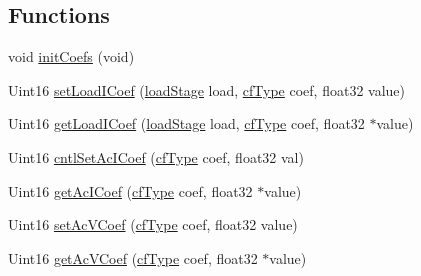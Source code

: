 \subsection*{Functions}
\begin{DoxyCompactItemize}
\item 
void \hyperlink{a00014_a91a941a20fc5a9465397d4701e0beaf4}{init\-Coefs} (void)
\item 
Uint16 \hyperlink{a00014_ac551a1fee10631510b139d6d97bb166c}{set\-Load\-I\-Coef} (\hyperlink{a00027_a2820f1e18d921d2f1e97d53404b9fbae}{load\-Stage} load, \hyperlink{a00014_ac340fbbc5919954c173757935549588f}{cf\-Type} coef, float32 value)
\item 
Uint16 \hyperlink{a00014_a86bea9827291d6230b0f3366bbd8ce27}{get\-Load\-I\-Coef} (\hyperlink{a00027_a2820f1e18d921d2f1e97d53404b9fbae}{load\-Stage} load, \hyperlink{a00014_ac340fbbc5919954c173757935549588f}{cf\-Type} coef, float32 $\ast$value)
\item 
Uint16 \hyperlink{a00014_a46a68710ce9ede60c43503c65300a585}{cntl\-Set\-Ac\-I\-Coef} (\hyperlink{a00014_ac340fbbc5919954c173757935549588f}{cf\-Type} coef, float32 val)
\item 
Uint16 \hyperlink{a00014_a766238d36085cd55f37f88fd8b2bb110}{get\-Ac\-I\-Coef} (\hyperlink{a00014_ac340fbbc5919954c173757935549588f}{cf\-Type} coef, float32 $\ast$value)
\item 
Uint16 \hyperlink{a00014_acaa99aafbcfaf6399a815e094c431474}{set\-Ac\-V\-Coef} (\hyperlink{a00014_ac340fbbc5919954c173757935549588f}{cf\-Type} coef, float32 value)
\item 
Uint16 \hyperlink{a00014_ad3161240a1aa23145fcba9506cb9001c}{get\-Ac\-V\-Coef} (\hyperlink{a00014_ac340fbbc5919954c173757935549588f}{cf\-Type} coef, float32 $\ast$value)
\end{DoxyCompactItemize}
